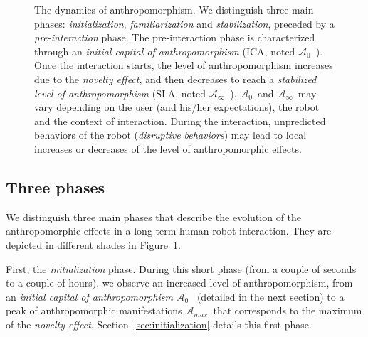 \documentclass{frontiersSCNS} %
\newcommand{\ICA}{{$\mathcal{A}_0$~}}
\newcommand{\SLA}{{$\mathcal{A}_\infty$~}}
\newcommand{\AntMax}{{$\mathcal{A}_{max}$~}}
\begin{document}
\begin{figure}[htb]

\caption{The dynamics of anthropomorphism. We distinguish three main phases:
    \emph{initialization}, \emph{familiarization} and \emph{stabilization},
    preceded by a \emph{pre-interaction} phase. The pre-interaction phase
    is characterized through an \emph{initial capital of anthropomorphism} (ICA, noted \ICA).
    Once the interaction starts, the level of anthropomorphism increases due to
    the \emph{novelty effect}, and then decreases to reach a \emph{stabilized
    level of anthropomorphism} (SLA, noted \SLA). \ICA and \SLA may vary
    depending on the user (and his/her expectations), the robot and the context of interaction.  During the
    interaction, unpredicted behaviors of the robot (\emph{disruptive
    behaviors}) may lead to local increases or decreases of the level of
    anthropomorphic effects.}

\label{fig:dynamics}
\end{figure}

\subsection{Three phases}
\label{sec:phases}

We distinguish three main phases that describe the evolution of the
anthropomorphic effects in a long-term human-robot interaction. They are
depicted in different shades in Figure~\ref{fig:dynamics}.

First, the \emph{initialization} phase. During this short phase (from a couple
of seconds to a couple of hours), we observe an increased level of
anthropomorphism, from an \emph{initial capital of anthropomorphism} \ICA
(detailed in the next section) to a peak of anthropomorphic manifestations
\AntMax that corresponds to the maximum of the \emph{novelty effect}.
Section~\ref{sec:initialization} details this first phase.
\end{document}
